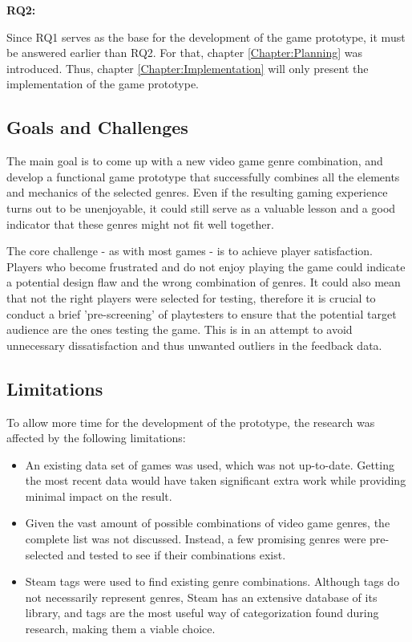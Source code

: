 \textbf{RQ2:} \researchQuestionTwo

Since RQ1 serves as the base for the development of the game prototype, it must be answered earlier than RQ2. For that, chapter \ref{Chapter:Planning} was introduced. Thus, chapter \ref{Chapter:Implementation} will only present the implementation of the game prototype.  



\subsection{Goals and Challenges}

The main goal is to come up with a new video game genre combination, and develop a functional game prototype that successfully combines all the elements and mechanics of the selected genres. Even if the resulting gaming experience turns out to be unenjoyable, it could still serve as a valuable lesson and a good indicator that these genres might not fit well together.

The core challenge - as with most games - is to achieve player satisfaction. Players who become frustrated and do not enjoy playing the game could indicate a potential design flaw and the wrong combination of genres. It could also mean that not the right players were selected for testing, therefore it is crucial to conduct a brief 'pre-screening' of playtesters to ensure that the potential target audience are the ones testing the game. This is in an attempt to avoid unnecessary dissatisfaction and thus unwanted outliers in the feedback data.



\subsection{Limitations} \label{Section:Limitations}

To allow more time for the development of the prototype, the research was affected by the following limitations:

\begin{itemize}
    \item An existing data set of games was used, which was not up-to-date. Getting the most recent data would have taken significant extra work while providing minimal impact on the result.
    \item Given the vast amount of possible combinations of video game genres, the complete list was not discussed. Instead, a few promising genres were pre-selected and tested to see if their combinations exist.
    \item Steam tags were used to find existing genre combinations. Although tags do not necessarily represent genres, Steam has an extensive database of its library, and tags are the most useful way of categorization found during research, making them a viable choice.
\end{itemize}

